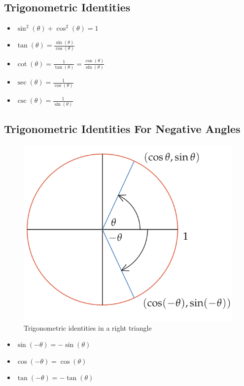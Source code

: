 \subsection{Trigonometric Identities}
\begin{itemize}
    \item $\sin^2(\theta) + \cos^2(\theta) = 1$
    \item $\tan(\theta) = \frac{\sin(\theta)}{\cos(\theta)}$
    \item $\cot(\theta) = \frac{1}{\tan(\theta)} = \frac{\cos(\theta)}{\sin(\theta)}$
    \item $\sec(\theta) = \frac{1}{\cos(\theta)}$
    \item $\csc(\theta) = \frac{1}{\sin(\theta)}$
\end{itemize}

\subsection{Trigonometric Identities For Negative Angles}
\begin{figure}
    \centering
    \includegraphics[scale=0.4]{pics/14.png}
    \caption{Trigonometric identities in a right triangle}
\end{figure}
\begin{itemize}
    \item $\sin(-\theta) = -\sin(\theta)$
    \item $\cos(-\theta) = \cos(\theta)$
    \item $\tan(-\theta) = -\tan(\theta)$
\end{itemize}

